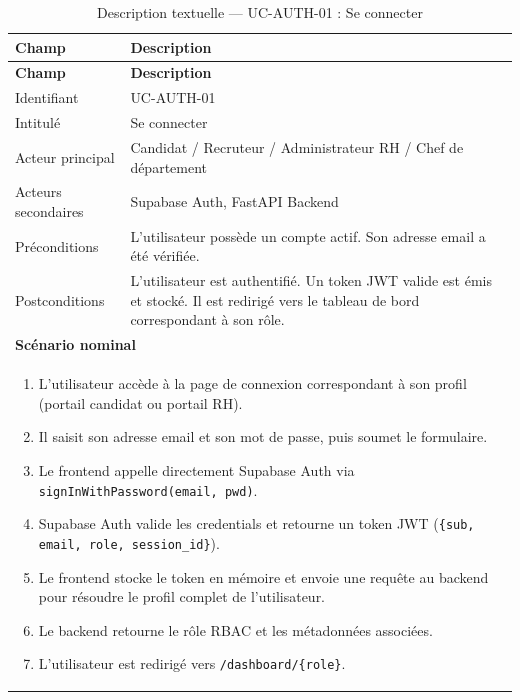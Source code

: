 \renewcommand{\arraystretch}{1.4}
\begin{longtable}{|p{4cm}|p{10cm}|}
\caption{Description textuelle — UC-AUTH-01 : Se connecter}
\label{tab:uc_auth01} \\
\hline
\rowcolor[HTML]{EFEFEF} \textbf{Champ} & \textbf{Description} \\ \hline
\endfirsthead
\hline
\rowcolor[HTML]{EFEFEF} \textbf{Champ} & \textbf{Description} \\ \hline
\endhead
\hline
\endfoot
\hline
\endlastfoot
Identifiant & UC-AUTH-01 \\ \hline
Intitulé & Se connecter \\ \hline
Acteur principal & Candidat / Recruteur / Administrateur RH / Chef de département \\ \hline
Acteurs secondaires & Supabase Auth, FastAPI Backend \\ \hline
Préconditions & L'utilisateur possède un compte actif. Son adresse email a été vérifiée. \\ \hline
Postconditions & L'utilisateur est authentifié. Un token JWT valide est émis et stocké. Il est redirigé vers le tableau de bord correspondant à son rôle. \\ \hline
\multicolumn{2}{|l|}{\textbf{Scénario nominal}} \\ \hline
\multicolumn{2}{|p{14.5cm}|}{
\vspace{2pt}
\begin{enumerate}
    \item L'utilisateur accède à la page de connexion correspondant à son profil (portail candidat ou portail RH).
    \item Il saisit son adresse email et son mot de passe, puis soumet le formulaire.
    \item Le frontend appelle directement Supabase Auth via \texttt{signInWithPassword(email, pwd)}.
    \item Supabase Auth valide les credentials et retourne un token JWT (\texttt{\{sub, email, role, session\_id\}}).
    \item Le frontend stocke le token en mémoire et envoie une requête au backend pour résoudre le profil complet de l'utilisateur.
    \item Le backend retourne le rôle RBAC et les métadonnées associées.
    \item L'utilisateur est redirigé vers \texttt{/dashboard/\{role\}}.
\end{enumerate}
\vspace{2pt}
} \\ \hline

\end{longtable}
